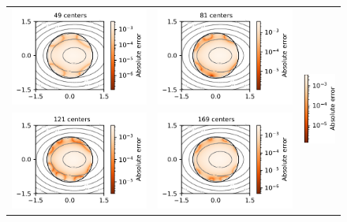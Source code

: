 \documentclass[12pt]{report} %
\begin{document}
\begin{figure}
  \hspace*{-.5cm}
  \begin{tabular}{ccl}
    {\includegraphics[width=.4\textwidth, clip=true,trim={0 0 2.1cm 0}]{imagenes/experiments/2d/pde_runge_2d/runge_2d_49.pdf}}                    &
    \includegraphics[width=.4\textwidth, clip=true,trim={0 0 2.1cm 0}]{imagenes/experiments/2d/pde_runge_2d/runge_2d_81.pdf}                      & \multirow{3}{*}{\includegraphics[width=.15\textwidth]{imagenes/experiments/2d/pde_runge_2d/legend.pdf}}    \\
    \multicolumn{1}{r}{\includegraphics[width=.4\textwidth, clip=true,trim={0 0 2.1cm 0}]{imagenes/experiments/2d/pde_runge_2d/runge_2d_121.pdf}} & \includegraphics[width=.4\textwidth, clip=true,trim={0 0 2.1cm 0}]{imagenes/experiments/2d/pde_runge_2d/runge_2d_169.pdf} & \\

\end{tabular}
\end{figure}
\end{document}
